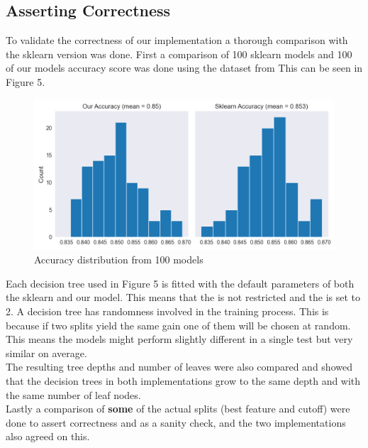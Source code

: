 \subsection{Asserting Correctness}
To validate the correctness of our implementation a thorough comparison with the sklearn version was done.
First a comparison of 100 sklearn models and 100 of our models accuracy score was done using the  dataset from 
This can be seen in Figure 5.\\

\begin{figure}[ht]
    \centering
    \includegraphics[scale=0.55]{figures_for_report/our_vs_sklearn_accuracy}
    \captionsetup{justification=centering,margin=2cm}
    \caption{Accuracy distribution from 100 models}
\end{figure}

Each decision tree used in Figure 5 is fitted with the default parameters of both the sklearn and our model.
This means that the  is not restricted and the  is set to 2.
A decision tree has randomness involved in the training process.
This is because if two splits yield the same gain one of them will be chosen at random.
This means the models might perform slightly different in a single test but very similar on average.\\

The resulting tree depths and number of leaves were also compared and showed that the decision trees in both implementations grow to the same
depth and with the same number of leaf nodes.
\\

Lastly a comparison of \textbf{some} of the actual splits (best feature and cutoff) were done to assert correctness and as a sanity check, and
the two implementations also agreed on this.\\

